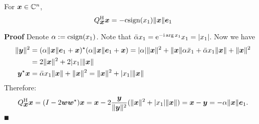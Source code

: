 \begin{lemma} For $\bm{{\mbox{\boldmath$x$\unboldmath}}} \in {\mathbb C}^n$,
\[
Q_{\bm{{\mbox{\boldmath$x$\unboldmath}}}}^{\rm H} \bm{{\mbox{\boldmath$x$\unboldmath}}} = -{\rm csign}(x_1) \|\bm{{\mbox{\boldmath$x$\unboldmath}}}\| \bm{{\mbox{\boldmath$e$\unboldmath}}}_1
\]
\end{lemma}
\textbf{Proof} Denote $\ensuremath{\alpha} := {\rm csign}(x_1)$.  Note that $\bar\alpha x_1 = {\rm e}^{-{\rm i} \arg x_1} x_1 = |x_1|$.  Now we have
\begin{align*}
\| \bm{{\mbox{\boldmath$y$\unboldmath}}} \|^2 &= (\alpha \|\bm{{\mbox{\boldmath$x$\unboldmath}}}\| \bm{{\mbox{\boldmath$e$\unboldmath}}}_1 + \bm{{\mbox{\boldmath$x$\unboldmath}}})^\star(\alpha \|\bm{{\mbox{\boldmath$x$\unboldmath}}}\| \bm{{\mbox{\boldmath$e$\unboldmath}}}_1 + \bm{{\mbox{\boldmath$x$\unboldmath}}}) = |\alpha|\| \bm{{\mbox{\boldmath$x$\unboldmath}}} \|^2 + \| \bm{{\mbox{\boldmath$x$\unboldmath}}} \|  \alpha \bar x_1 + \bar\alpha x_1 \| \bm{{\mbox{\boldmath$x$\unboldmath}}} \| + \| \bm{{\mbox{\boldmath$x$\unboldmath}}} \|^2 \\
&= 2\| \bm{{\mbox{\boldmath$x$\unboldmath}}} \|^2 + 2|x_1| \| \bm{{\mbox{\boldmath$x$\unboldmath}}} \| \\
\bm{{\mbox{\boldmath$y$\unboldmath}}}^\star \bm{{\mbox{\boldmath$x$\unboldmath}}} &= \bar\alpha x_1 \| \bm{{\mbox{\boldmath$x$\unboldmath}}} \| + \|\bm{{\mbox{\boldmath$x$\unboldmath}}} \|^2 = \|\bm{{\mbox{\boldmath$x$\unboldmath}}} \|^2 + |x_1| \| \bm{{\mbox{\boldmath$x$\unboldmath}}} \|
\end{align*}
Therefore:
\[
Q_{\bm{{\mbox{\boldmath$x$\unboldmath}}}}^{\rm H} \bm{{\mbox{\boldmath$x$\unboldmath}}}  =  (I - 2 \bm{{\mbox{\boldmath$w$\unboldmath}}} \bm{{\mbox{\boldmath$w$\unboldmath}}}^\star) \bm{{\mbox{\boldmath$x$\unboldmath}}} = \bm{{\mbox{\boldmath$x$\unboldmath}}} - 2 {\bm{{\mbox{\boldmath$y$\unboldmath}}}    \over \|\bm{{\mbox{\boldmath$y$\unboldmath}}}\|^2} (\|\bm{{\mbox{\boldmath$x$\unboldmath}}} \|^2 + |x_1| \|\bm{{\mbox{\boldmath$x$\unboldmath}}} \|) = \bm{{\mbox{\boldmath$x$\unboldmath}}} - \bm{{\mbox{\boldmath$y$\unboldmath}}} =  -\alpha \|\bm{{\mbox{\boldmath$x$\unboldmath}}}\| \bm{{\mbox{\boldmath$e$\unboldmath}}}_1.
\]
\ensuremath{\QED}



